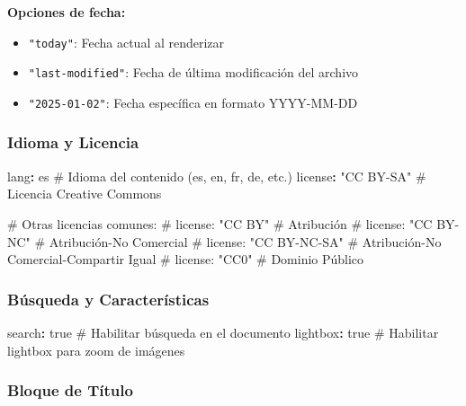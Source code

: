 \documentclass[
  doc,
  floatsintext,
  longtable,
  a4paper,
  nolmodern,
  notxfonts,
  notimes,
  12pt,
  colorlinks=true,linkcolor=blue,citecolor=blue,urlcolor=blue]{apa7}
\newenvironment{Shaded}{\begin{snugshade}}{\end{snugshade}}
\newcommand{\AttributeTok}[1]{\textcolor[rgb]{0.40,0.45,0.13}{#1}}
\newcommand{\CharTok}[1]{\textcolor[rgb]{0.13,0.47,0.30}{#1}}
\newcommand{\CommentTok}[1]{\textcolor[rgb]{0.37,0.37,0.37}{#1}}
\newcommand{\FunctionTok}[1]{\textcolor[rgb]{0.28,0.35,0.67}{#1}}
\newcommand{\KeywordTok}[1]{\textcolor[rgb]{0.00,0.23,0.31}{\textbf{#1}}}
\newcommand{\StringTok}[1]{\textcolor[rgb]{0.13,0.47,0.30}{#1}}
\providecommand{\tightlist}{%
  \setlength{\itemsep}{0pt}\setlength{\parskip}{0pt}}
\begin{document}
\textbf{Opciones de fecha:}

\begin{itemize}
\tightlist
\item
  \texttt{"today"}: Fecha actual al renderizar
\item
  \texttt{"last-modified"}: Fecha de última modificación del archivo
\item
  \texttt{"2025-01-02"}: Fecha específica en formato YYYY-MM-DD
\end{itemize}

\subsubsection{Idioma y Licencia}\label{idioma-y-licencia}

\begin{Shaded}
\begin{Highlighting}[]
\FunctionTok{lang}\KeywordTok{:}\AttributeTok{ es}\CommentTok{                     \# Idioma del contenido (es, en, fr, de, etc.)}
\FunctionTok{license}\KeywordTok{:}\AttributeTok{ }\StringTok{"CC BY{-}SA"}\CommentTok{          \# Licencia Creative Commons}

\CommentTok{\# Otras licencias comunes:}
\CommentTok{\# license: "CC BY"           \# Atribución}
\CommentTok{\# license: "CC BY{-}NC"        \# Atribución{-}No Comercial}
\CommentTok{\# license: "CC BY{-}NC{-}SA"     \# Atribución{-}No Comercial{-}Compartir Igual}
\CommentTok{\# license: "CC0"             \# Dominio Público}
\end{Highlighting}
\end{Shaded}

\subsubsection{Búsqueda y
Características}\label{buxfasqueda-y-caracteruxedsticas}

\begin{Shaded}
\begin{Highlighting}[]
\FunctionTok{search}\KeywordTok{:}\AttributeTok{ }\CharTok{true}\CommentTok{                 \# Habilitar búsqueda en el documento}
\FunctionTok{lightbox}\KeywordTok{:}\AttributeTok{ }\CharTok{true}\CommentTok{               \# Habilitar lightbox para zoom de imágenes}
\end{Highlighting}
\end{Shaded}

\subsubsection{Bloque de Título}\label{bloque-de-tuxedtulo}
\end{document}
